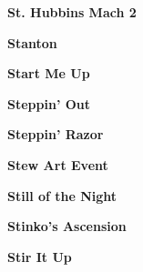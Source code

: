 \newline
\vspace{10pt} 
\begin{center}\textbf{St. Hubbins Mach 2}\end{center}
\newline
\vspace{10pt} 
\begin{center}\textbf{Stanton}\end{center}
\newline
\vspace{10pt} 
\begin{center}\textbf{Start Me Up}\end{center}
\newline
\vspace{10pt} 
\begin{center}\textbf{Steppin' Out}\end{center}
\newline
\vspace{10pt} 
\begin{center}\textbf{Steppin' Razor}\end{center}
\newline
\vspace{10pt} 
\begin{center}\textbf{Stew Art Event}\end{center}
\newline
\vspace{10pt} 
\begin{center}\textbf{Still of the Night}\end{center}
\newline
\vspace{10pt} 
\begin{center}\textbf{Stinko's Ascension}\end{center}
\newline
\vspace{10pt} 
\begin{center}\textbf{Stir It Up}\end{center}
\newline
\vspace{10pt} 
